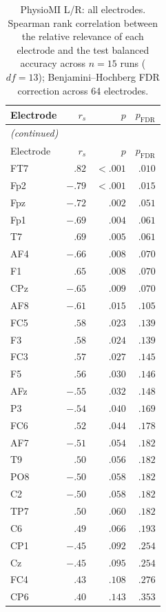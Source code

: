 {\small\setlength{\tabcolsep}{4pt}
\begin{longtable}{lrrr}
\caption{PhysioMI L/R: all electrodes. Spearman rank correlation between the relative relevance of each electrode and the test balanced accuracy across $n = 15$ runs ($\mathit{df} = 13$); Benjamini--Hochberg FDR correction across 64 electrodes.}\label{tab:physiomi_spearman_bacc_all} \\
\toprule
Electrode & $r_s$ & $p$ & $p_{\mathrm{FDR}}$ \\
\midrule
\endfirsthead
\multicolumn{4}{l}{\emph{(continued)}} \\
\toprule
Electrode & $r_s$ & $p$ & $p_{\mathrm{FDR}}$ \\
\midrule
\endhead
\bottomrule
\endfoot
FT7 & $.82$ & $< .001$ & $.010$ \\
Fp2 & $-.79$ & $< .001$ & $.015$ \\
Fpz & $-.72$ & $.002$ & $.051$ \\
Fp1 & $-.69$ & $.004$ & $.061$ \\
T7 & $.69$ & $.005$ & $.061$ \\
AF4 & $-.66$ & $.008$ & $.070$ \\
F1 & $.65$ & $.008$ & $.070$ \\
CPz & $-.65$ & $.009$ & $.070$ \\
AF8 & $-.61$ & $.015$ & $.105$ \\
FC5 & $.58$ & $.023$ & $.139$ \\
F3 & $.58$ & $.024$ & $.139$ \\
FC3 & $.57$ & $.027$ & $.145$ \\
F5 & $.56$ & $.030$ & $.146$ \\
AFz & $-.55$ & $.032$ & $.148$ \\
P3 & $-.54$ & $.040$ & $.169$ \\
FC6 & $.52$ & $.044$ & $.178$ \\
AF7 & $-.51$ & $.054$ & $.182$ \\
T9 & $.50$ & $.056$ & $.182$ \\
PO8 & $-.50$ & $.058$ & $.182$ \\
C2 & $-.50$ & $.058$ & $.182$ \\
TP7 & $.50$ & $.060$ & $.182$ \\
C6 & $.49$ & $.066$ & $.193$ \\
CP1 & $-.45$ & $.092$ & $.254$ \\
Cz & $-.45$ & $.095$ & $.254$ \\
FC4 & $.43$ & $.108$ & $.276$ \\
CP6 & $.40$ & $.143$ & $.353$ \\

\end{longtable}}
